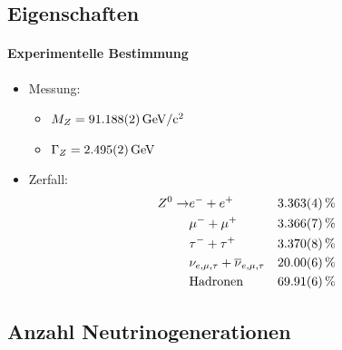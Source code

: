 \subsection{Eigenschaften}
\begin{iframe}
	\framesubtitle{Experimentelle Bestimmung}
	\begin{itemize}
		\item Messung: %
		\begin{itemize}
			\item $M_Z = \SI{91.188+-0.002}{GeV/c^2}$
			\item $\Gamma_Z = \SI{2.495+-0.002}{GeV}$
		\end{itemize}
		\pause
		\item Zerfall:
		\begin{align*}
			Z^0 \rightarrow & e^- + e^+ & \SI{3.363+-0.004}{\%} \\
			& \mu^- + \mu^+ & \SI{3.366+-0.007}{\%} \\
			& \tau^- + \tau^+ & \SI{3.370+-0.008}{\%} \\
			& \nu_{e,\mu,\tau} + \overline{\nu}_{e,\mu,\tau} & \SI{20+-0.06}{\%} \\
			& \text{Hadronen} & \SI{69.91+-0.06}{\%} \\ %
		\end{align*}
	\end{itemize}
	 {
	}
	\only<2> {
}
\end{iframe}

\subsection{Anzahl Neutrinogenerationen}

